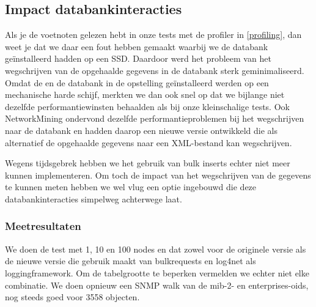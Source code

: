 \subsection{Impact databankinteracties}
\label{impact-db}

Als je de voetnoten gelezen hebt in onze tests met de profiler in \cref{profiling},
dan weet je dat we daar een fout hebben gemaakt waarbij we de databank geïnstalleerd hadden op een SSD.
Daardoor werd het probleem van het wegschrijven van de opgehaalde gegevens in de databank sterk geminimaliseerd.
Omdat de \nwmretriever{} en de databank in de \vwall{}opstelling geïnstalleerd werden op een mechanische harde schijf,
merkten we dan ook snel op dat we bijlange niet dezelfde performantiewinsten behaalden als bij onze kleinschalige tests.
Ook NetworkMining ondervond dezelfde performantieproblemen bij het wegschrijven naar de databank en hadden daarop een nieuwe versie ontwikkeld die als alternatief
de opgehaalde gegevens naar een XML-bestand kan wegschrijven.

Wegens tijdsgebrek hebben we het gebruik van bulk inserts echter niet meer kunnen implementeren.
Om toch de impact van het wegschrijven van de gegevens te kunnen meten hebben we wel vlug een optie ingebouwd
die deze databankinteracties simpelweg achterwege laat.

\subsubsection{Meetresultaten}

We doen de test met 1, 10 en 100 nodes en dat zowel voor de originele versie als de nieuwe versie die gebruik maakt van bulkrequests en log4net als loggingframework.
Om de tabelgrootte te beperken vermelden we echter niet elke combinatie.
We doen opnieuw een SNMP walk van de mib-2- en enterprises-\glspl{oid}, nog steeds goed voor 3558 objecten.

